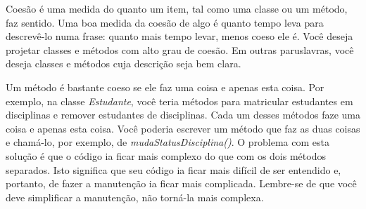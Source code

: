Coesão é uma medida do quanto um item, tal como uma classe ou um método, faz sentido. Uma boa medida da coesão de algo é quanto tempo leva para descrevê-lo numa frase: quanto mais tempo levar, menos coeso ele é. Você deseja projetar classes e métodos com alto grau de coesão. Em outras paruslavras, você deseja classes e métodos cuja descrição seja bem clara.

Um método é bastante coeso se ele faz uma coisa e apenas esta coisa. Por exemplo, na classe \emph{Estudante}, você teria métodos para matricular estudantes em disciplinas e remover estudantes de disciplinas. Cada um desses métodos faze uma coisa e apenas esta coisa. Você poderia escrever um método que faz as duas coisas e chamá-lo, por exemplo, de \emph{mudaStatusDisciplina()}. O problema com esta solução é que o código ia ficar mais complexo do que com os dois métodos separados. Isto significa que seu código ia ficar mais difícil de ser entendido e, portanto, de fazer a manutenção ia ficar mais complicada. Lembre-se de que você deve simplificar a manutenção, não torná-la mais complexa.

\noindent {}

